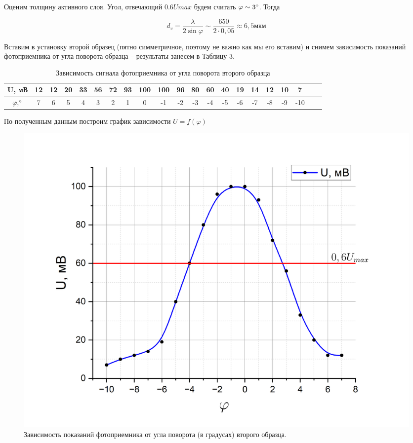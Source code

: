 \documentclass[a4paper,12pt]{article}
\begin{document}
Оценим толщину активного слоя. Угол, отвечающий $0.6U{max}$ будем считать $\varphi \sim 3 \degree$. Тогда

$$
	d_{v} = \frac{\lambda}{2 \sin \varphi} \sim \frac{650}{2 \cdot 0,05 } \approx 6,5 \text{мкм}
$$

\newpage

Вставим в установку второй образец (пятно симметричное, поэтому не важно как мы его вставим) и снимем зависимость показаний фотоприемника от угла поворота образца -- результаты занесем в Таблицу 3.

\begin{table}[h!]
\centering
\caption{Зависимость сигнала фотоприемника от угла поворота второго образца}
\begin{tabular}{|c|c|c|c|c|c|c|c|c|c|c|c|c|c|c|c|c|c|c|c|c|}
\hline
U, мВ & 12 & 12 & 20 & 33 & 56 & 72 & 93 & 100 & 100 & 96 & 80 & 60 & 40 & 19 & 14 & 12 & 10 & 7   \\ \hline
$\varphi, \degree$    & 7  & 6  & 5  & 4  & 3  & 2  & 1  & 0   & -1  & -2 & -3 & -4 & -5 & -6 & -7 & -8 & -9 & -10 \\ \hline
\end{tabular}
\end{table}

По полученным данным построим график зависимости $U = f(\varphi)$

\begin{figure}[h!]
	\centering
	\includegraphics[width=0.95\linewidth]{Diod}
	\caption{Зависимость показаний фотоприемника от угла поворота (в градусах) второго образца.}
\end{figure}
\end{document}
